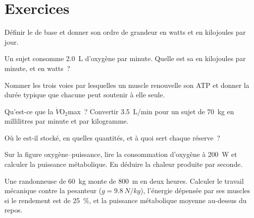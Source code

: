 \section{Exercices}

\begin{exercise}[$\star$]\label{exo:g10:exercise-and-energy:1}
Définir le  de base et donner son ordre de grandeur en watts
et en kilojoules par jour.
\end{exercise}

\begin{exercise}[$\star$]\label{exo:g10:exercise-and-energy:2}
Un sujet consomme \qty{2.0}{L} d'oxygène par minute. Quelle est sa
 en kilojoules par minute, et en watts~?
\end{exercise}

\begin{exercise}[$\star$]\label{exo:g10:exercise-and-energy:3}
Nommer les trois voies par lesquelles un muscle renouvelle son ATP et
donner la durée typique que chacune peut soutenir à elle seule.
\end{exercise}

\begin{exercise}[$\star$]\label{exo:g10:exercise-and-energy:4}
Qu'est-ce que la $\dot V\!\mathrm{O_2}$max~? Convertir \qty{3.5}{L/min}
pour un sujet de \qty{70}{kg} en millilitres par minute et par
kilogramme.
\end{exercise}

\begin{exercise}[$\star$]\label{exo:g10:exercise-and-energy:5}
Où le  est-il stocké, en quelles quantités, et à quoi sert
chaque réserve~?
\end{exercise}

\begin{exercise}[$\star\star$]\label{exo:g10:exercise-and-energy:6}
Sur la figure oxygène--puissance, lire la consommation d'oxygène à
\qty{200}{W} et calculer la puissance métabolique. En déduire la
chaleur produite par seconde.
\end{exercise}

\begin{exercise}[$\star\star$]\label{exo:g10:exercise-and-energy:7}
Une randonneuse de \qty{60}{kg} monte de \qty{800}{m} en deux heures.
Calculer le travail mécanique contre la pesanteur
($g = \qty{9.8}{N/kg}$), l'énergie dépensée par ses muscles si le
rendement est de 25~\%, et la puissance métabolique moyenne au-dessus
du repos.
\end{exercise}

